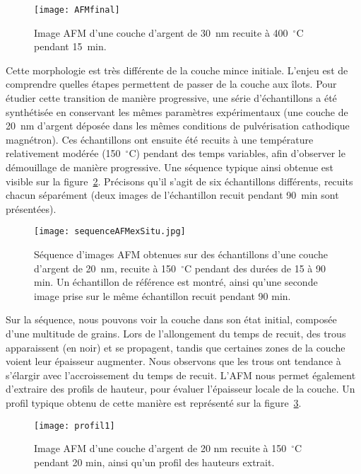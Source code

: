 \begin{figure}[htb!]
	\centering
	\texttt{[image: AFMfinal]}
	\caption{Image AFM d'une couche d'argent de 30~nm recuite à 400~$^\circ$C pendant 15~min.}
	\label{AFMfinal}
\end{figure}

Cette morphologie est très différente de la couche mince initiale. L'enjeu est de comprendre quelles étapes permettent de passer de la couche aux îlots. Pour étudier cette transition de manière progressive, une série d'échantillons a été synthétisée en conservant les mêmes paramètres expérimentaux (une couche de 20~nm d'argent déposée dans les mêmes conditions de pulvérisation cathodique magnétron). Ces échantillons ont ensuite été recuits à une température relativement modérée (150~$^\circ$C) pendant des temps variables, afin d'observer le démouillage de manière progressive. Une séquence typique ainsi obtenue est visible sur la figure~\ref{AFMexSitu}. Précisons qu'il s'agit de six échantillons différents, recuits chacun séparément (deux images de l'échantillon recuit pendant 90~min sont présentées).\par

\begin{figure}[htb!]
	\centering
	\texttt{[image: sequenceAFMexSitu.jpg]}
	\caption{Séquence d'images AFM obtenues sur des échantillons d'une couche d'argent de 20~nm, recuite à 150~$^\circ$C pendant des durées de 15 à 90 min. Un échantillon de référence est montré, ainsi qu'une seconde image prise sur le même échantillon recuit pendant 90 min.}
	\label{AFMexSitu}
\end{figure}

Sur la séquence, nous pouvons voir la couche dans son état initial, composée d'une multitude de grains. Lors de l'allongement du temps de recuit, des trous apparaissent (en noir) et se propagent, tandis que certaines zones de la couche voient leur épaisseur augmenter. Nous observons que les trous ont tendance à s'élargir avec l'accroissement du temps de recuit. L'AFM nous permet également d'extraire des profils de hauteur, pour évaluer l'épaisseur locale de la couche. Un profil typique obtenu de cette manière est représenté sur la figure~\ref{profil1}.

\begin{figure}[h!]
	\centering
	\texttt{[image: profil1]}
	\caption{Image AFM d'une couche d'argent de 20 nm recuite à 150~$^\circ$C pendant 20 min, ainsi qu'un profil des hauteurs extrait.}
	\label{profil1}
\end{figure}

